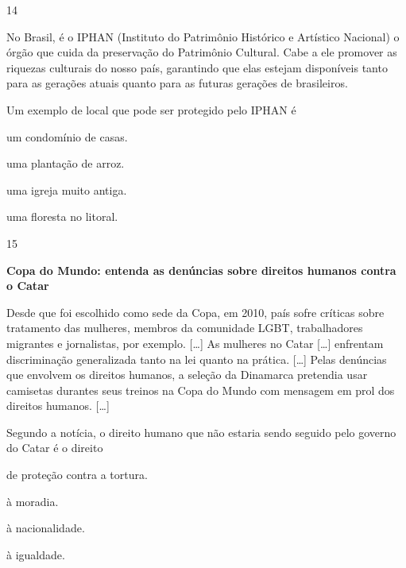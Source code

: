 \pagebreak
\num{14}

\begin{myquote}
No Brasil, é o IPHAN (Instituto do Patrimônio Histórico e Artístico Nacional) o órgão que cuida da preservação do Patrimônio Cultural. Cabe
a ele promover as riquezas culturais do nosso país, garantindo que elas estejam disponíveis tanto para as gerações atuais quanto para as futuras gerações de brasileiros.
\end{myquote}

\noindent{}Um exemplo de local que pode ser protegido pelo IPHAN é

\begin{escolha}
\item um condomínio de casas.

\item uma plantação de arroz.

\item uma igreja muito antiga.

\item uma floresta no litoral.
\end{escolha}


\num{15}

\begin{myquote}
\textbf{Copa do Mundo: entenda as denúncias sobre direitos humanos contra o Catar }

Desde que foi escolhido como sede da Copa, em 2010, país sofre críticas
sobre tratamento das mulheres, membros da comunidade LGBT, trabalhadores
migrantes e jornalistas, por exemplo. {[}\ldots{}{]}
As mulheres no Catar {[}\ldots{}{]}
enfrentam discriminação generalizada tanto na lei quanto na prática. {[}\ldots{}{]}
Pelas denúncias que envolvem os direitos humanos, a seleção da Dinamarca
pretendia usar camisetas durantes seus treinos na Copa do Mundo com
mensagem em prol dos direitos humanos. {[}\ldots{}{]}

\end{myquote}

Segundo a notícia, o direito humano que não estaria sendo seguido
pelo governo do Catar é o direito

\begin{escolha}
\item de proteção contra a tortura.

\item à moradia.

\item à nacionalidade.

\item à igualdade.
\end{escolha}

